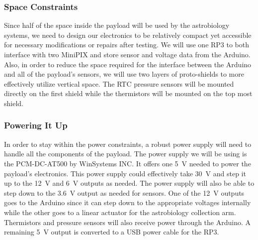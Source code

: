 \subsubsection{Space Constraints}
Since half of the space inside the payload will be used by the astrobiology systems, we need to design our electronics to be relatively compact yet accessible for necessary modifications or repairs after testing. We will use one RP3 to both interface with two MiniPIX and store sensor and voltage data from the Arduino.  Also, in order to reduce the space required for the interface between the Arduino and all of the payload's sensors, we will use two layers of proto-shields to more effectively utilize vertical space. The RTC pressure sensors will be mounted directly on the first shield while the thermistors will be mounted on the top most shield. 

\subsubsection{Powering It Up}
 In order to stay within the power constraints, a robust power supply will need to  handle all the components of the payload.  The power supply we will be using is the PCM-DC-AT500 by WinSystems INC.  It offers one \SI{+5}{\volt} needed to power the payload's electronics.  This power supply could effectively take \SI{+30}{\volt} and step it up to the \SI{+12}{\volt} and \SI{+6}{\volt} outputs as needed. The power supply will also be able to step down to the \SI{+3.6 }{\volt} output as needed for sensors. One of the \SI{+12}{\volt} outputs goes to the Arduino since it can step down to the appropriate voltages internally while the other goes to a linear actuator for the astrobiology collection arm. Thermistors and pressure sensors will also receive power through the Arduino. A remaining \SI{+5 }{\volt} output is converted to a USB power cable for the RP3. 

